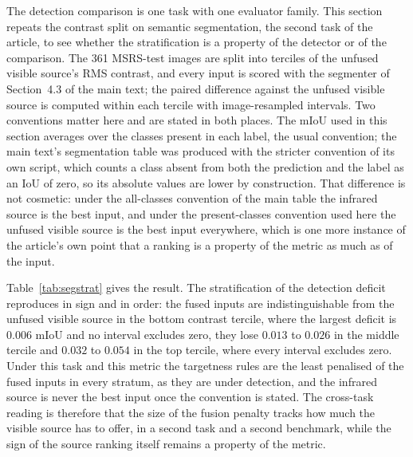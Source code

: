 \documentclass[11pt,a4paper]{article}
\begin{document}
The detection comparison is one task with one evaluator family. This section repeats
the contrast split on semantic segmentation, the second task of the article, to see
whether the stratification is a property of the detector or of the comparison. The
361 MSRS-test images are split into terciles of the unfused visible source's RMS
contrast, and every input is scored with the segmenter of Section~4.3 of the main text;
the paired difference against the unfused visible source is computed within each
tercile with image-resampled intervals. Two conventions matter here and are stated in
both places. The mIoU used in this section averages over the classes present in each
label, the usual convention; the main text's segmentation table was produced with the
stricter convention of its own script, which counts a class absent from both the
prediction and the label as an IoU of zero, so its absolute values are lower by
construction. That difference is not cosmetic: under the all-classes convention of the
main table the infrared source is the best input, and under the present-classes
convention used here the unfused visible source is the best input everywhere, which is
one more instance of the article's own point that a ranking is a property of the metric
as much as of the input.

Table~\ref{tab:segstrat} gives the result. The stratification of the detection deficit
reproduces in sign and in order: the fused inputs are indistinguishable from the
unfused visible source in the bottom contrast tercile, where the largest deficit is
$0.006$ mIoU and no interval excludes zero, they lose $0.013$ to $0.026$ in the middle
tercile and $0.032$ to $0.054$ in the top tercile, where every interval excludes zero.
Under this task and this metric the targetness rules are the least penalised of the
fused inputs in every stratum, as they are under detection, and the infrared source is
never the best input once the convention is stated. The cross-task reading is
therefore that the size of the fusion penalty tracks how much the visible source has to
offer, in a second task and a second benchmark, while the sign of the source ranking
itself remains a property of the metric.
\end{document}
